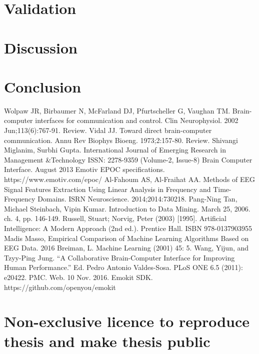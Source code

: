 \documentclass[12pt]{article}
\begin{document}
\newpage
\section{Validation}

\newpage
\section{Discussion}

\newpage
\section{Conclusion}

\newpage
\begin{thebibliography}{9}

Wolpaw JR, Birbaumer N, McFarland DJ, Pfurtscheller G, Vaughan TM.
Brain-computer interfaces for communication and control. Clin Neurophysiol. 2002 
Jun;113(6):767-91. Review.
Vidal JJ. Toward direct brain-computer communication. Annu Rev Biophys Bioeng.
1973;2:157-80. Review.
Shivangi Miglanim, Surbhi Gupta.  International Journal of Emerging Research in Management \&Technology
ISSN: 2278-9359 (Volume-2, Issue-8)
Brain Computer Interface. 
August 2013
Emotiv EPOC specifications. https://www.emotiv.com/epoc/
Al-Fahoum AS, Al-Fraihat AA. Methods of EEG Signal Features Extraction Using Linear Analysis in Frequency and Time-Frequency Domains. ISRN Neuroscience. 2014;2014:730218.
Pang-Ning Tan, Michael Steinbach, Vipin Kumar. Introduction to Data Mining. March 25, 2006. ch. 4, pp. 146-149.
Russell, Stuart; Norvig, Peter (2003) [1995]. Artificial Intelligence: A Modern Approach (2nd ed.). Prentice Hall. ISBN 978-0137903955
Madis Masso, Empirical Comparison of Machine Learning Algorithms Based on EEG Data. 2016
Breiman, L. Machine Learning (2001) 45: 5. 
Wang, Yijun, and Tzyy-Ping Jung. ``A Collaborative Brain-Computer Interface for Improving Human Performance.'' Ed. Pedro Antonio Valdes-Sosa. PLoS ONE 6.5 (2011): e20422. PMC. Web. 10 Nov. 2016.
Emokit SDK. https://github.com/openyou/emokit
\end{thebibliography}

%

\appendix
\pagebreak
\section*{\small Non-exclusive licence to reproduce thesis and make thesis public}
\end{document}
